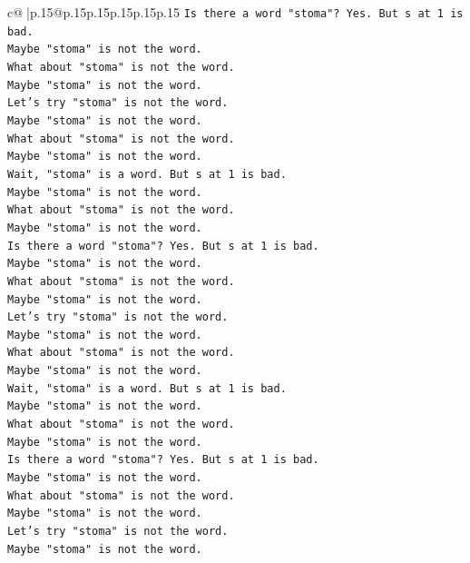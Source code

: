\documentclass{article}
\begin{document}
{\begin{supertabular}{c@{$\;$}|p{.15\linewidth}@{}p{.15\linewidth}p{.15\linewidth}p{.15\linewidth}p{.15\linewidth}p{.15\linewidth}}
{{{\texttt{Is there a word "stoma"? Yes. But s at 1 is bad.} \\
\texttt{Maybe "stoma" is not the word.} \\
\texttt{What about "stoma" is not the word.} \\
\texttt{Maybe "stoma" is not the word.} \\
\texttt{Let's try "stoma" is not the word.} \\
\texttt{Maybe "stoma" is not the word.} \\
\texttt{What about "stoma" is not the word.} \\
\texttt{Maybe "stoma" is not the word.} \\
\texttt{Wait, "stoma" is a word. But s at 1 is bad.} \\
\texttt{Maybe "stoma" is not the word.} \\
\texttt{What about "stoma" is not the word.} \\
\texttt{Maybe "stoma" is not the word.} \\
\texttt{Is there a word "stoma"? Yes. But s at 1 is bad.} \\
\texttt{Maybe "stoma" is not the word.} \\
\texttt{What about "stoma" is not the word.} \\
\texttt{Maybe "stoma" is not the word.} \\
\texttt{Let's try "stoma" is not the word.} \\
\texttt{Maybe "stoma" is not the word.} \\
\texttt{What about "stoma" is not the word.} \\
\texttt{Maybe "stoma" is not the word.} \\
\texttt{Wait, "stoma" is a word. But s at 1 is bad.} \\
\texttt{Maybe "stoma" is not the word.} \\
\texttt{What about "stoma" is not the word.} \\
\texttt{Maybe "stoma" is not the word.} \\
\texttt{Is there a word "stoma"? Yes. But s at 1 is bad.} \\
\texttt{Maybe "stoma" is not the word.} \\
\texttt{What about "stoma" is not the word.} \\
\texttt{Maybe "stoma" is not the word.} \\
\texttt{Let's try "stoma" is not the word.} \\
\texttt{Maybe "stoma" is not the word.} \\
}}}
\end{supertabular}}
\end{document}
